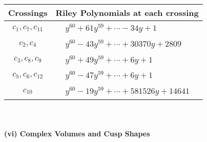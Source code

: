 \documentclass[1p]{elsarticle_modified}
\theoremstyle{definition}
\begin{document}
\begin{tabular}{m{50pt}|m{274pt}}
Crossings & \hspace{64pt}Riley Polynomials at each crossing \\
\hline $$\begin{aligned}c_{1},c_{7},c_{11}\end{aligned}$$&$\begin{aligned}
&y^{60}+61 y^{59}+\cdots-34 y+1
\end{aligned}$\\
\hline $$\begin{aligned}c_{2},c_{4}\end{aligned}$$&$\begin{aligned}
&y^{60}-43 y^{59}+\cdots+30370 y+2809
\end{aligned}$\\
\hline $$\begin{aligned}c_{3},c_{8},c_{9}\end{aligned}$$&$\begin{aligned}
&y^{60}+49 y^{59}+\cdots+6 y+1
\end{aligned}$\\
\hline $$\begin{aligned}c_{5},c_{6},c_{12}\end{aligned}$$&$\begin{aligned}
&y^{60}-47 y^{59}+\cdots+6 y+1
\end{aligned}$\\
\hline $$\begin{aligned}c_{10}\end{aligned}$$&$\begin{aligned}
&y^{60}-19 y^{59}+\cdots+581526 y+14641
\end{aligned}$\\
\hline
\end{tabular}\\~\\
\newpage\flushleft \textbf{(vi) Complex Volumes and Cusp Shapes}
\end{document}
